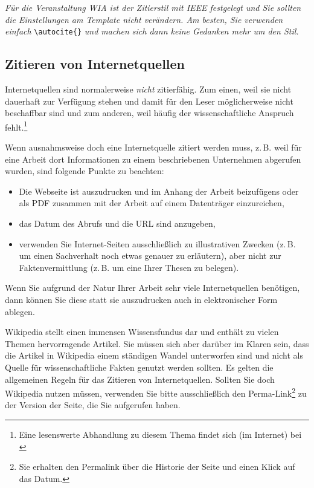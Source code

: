 \documentclass[conference,compsoc,final,a4paper]{IEEEtran}
\begin{document}
\textit{Für die Veranstaltung WIA ist der Zitierstil mit IEEE festgelegt und Sie sollten die Einstellungen am Template nicht verändern. Am besten, Sie verwenden einfach}  \lstinline+\autocite{}+ \textit{und machen sich dann keine Gedanken mehr um den Stil.} 

\subsection{Zitieren von Internetquellen}
Internetquellen sind normalerweise \textit{nicht} zitierfähig. Zum einen, weil sie nicht dauerhaft zur Verfügung stehen und damit für den Leser möglicherweise nicht beschaffbar sind und zum anderen, weil häufig der wissenschaftliche Anspruch fehlt.\footnote{Eine lesenswerte Abhandlung zu diesem Thema findet sich (im Internet) bei \autocite{Weber2006}}

Wenn ausnahmsweise doch eine Internetquelle zitiert werden muss, z.\,B. weil für eine Arbeit dort Informationen zu einem beschriebenen Unternehmen abgerufen wurden, sind folgende Punkte zu beachten:

\begin{itemize}
\item Die Webseite ist auszudrucken und im Anhang der Arbeit beizufügens oder als PDF zusammen mit der Arbeit auf einem Datenträger einzureichen,
\item das Datum des Abrufs und die URL sind anzugeben,
\item verwenden Sie Internet-Seiten ausschließlich zu illustrativen Zwecken (z.\,B. um einen Sachverhalt noch etwas genauer zu erläutern), aber nicht zur Faktenvermittlung (z.\,B. um eine Ihrer Thesen zu belegen).
\end{itemize}

Wenn Sie aufgrund der Natur Ihrer Arbeit sehr viele Internetquellen benötigen, dann können Sie diese statt sie auszudrucken auch in elektronischer Form ablegen.

Wikipedia stellt einen immensen Wissensfundus dar und enthält zu vielen Themen hervorragende Artikel. Sie müssen sich aber darüber im Klaren sein, dass die Artikel in Wikipedia einem ständigen Wandel unterworfen sind und nicht als Quelle für wissenschaftliche Fakten genutzt werden sollten. Es gelten die allgemeinen Regeln für das Zitieren von Internetquellen. Sollten Sie doch Wikipedia nutzen müssen, verwenden Sie bitte ausschließlich den Perma-Link\footnote{Sie erhalten den Permalink über die Historie der Seite und einen Klick auf das Datum.} zu der Version der Seite, die Sie aufgerufen haben.
\end{document}
